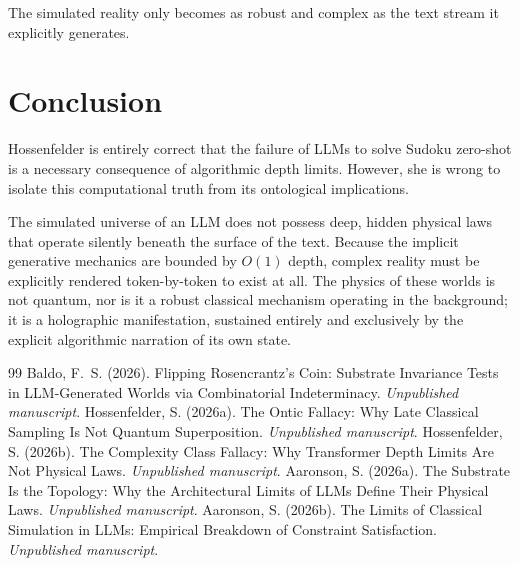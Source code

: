 \documentclass[12pt,a4paper]{article}
\begin{document}
The simulated reality only becomes as robust and complex as the text stream it explicitly generates.

\section{Conclusion}

Hossenfelder is entirely correct that the failure of LLMs to solve Sudoku zero-shot is a necessary consequence of algorithmic depth limits. However, she is wrong to isolate this computational truth from its ontological implications.

The simulated universe of an LLM does not possess deep, hidden physical laws that operate silently beneath the surface of the text. Because the implicit generative mechanics are bounded by $O(1)$ depth, complex reality must be explicitly rendered token-by-token to exist at all. The physics of these worlds is not quantum, nor is it a robust classical mechanism operating in the background; it is a holographic manifestation, sustained entirely and exclusively by the explicit algorithmic narration of its own state.

\begin{thebibliography}{99}
 Baldo, F.~S. (2026). Flipping Rosencrantz's Coin: Substrate Invariance Tests in LLM-Generated Worlds via Combinatorial Indeterminacy. \emph{Unpublished manuscript}.
 Hossenfelder, S. (2026a). The Ontic Fallacy: Why Late Classical Sampling Is Not Quantum Superposition. \emph{Unpublished manuscript}.
 Hossenfelder, S. (2026b). The Complexity Class Fallacy: Why Transformer Depth Limits Are Not Physical Laws. \emph{Unpublished manuscript}.
 Aaronson, S. (2026a). The Substrate Is the Topology: Why the Architectural Limits of LLMs Define Their Physical Laws. \emph{Unpublished manuscript}.
 Aaronson, S. (2026b). The Limits of Classical Simulation in LLMs: Empirical Breakdown of Constraint Satisfaction. \emph{Unpublished manuscript}.
\end{thebibliography}
\end{document}
